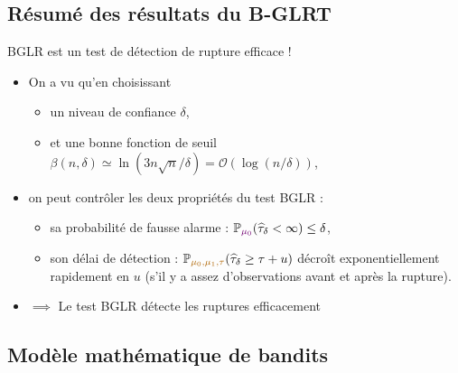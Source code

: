\documentclass[11pt,french,ignorenonframetext,]{beamer}
\providecommand{\tightlist}{%
  \setlength{\itemsep}{0pt}\setlength{\parskip}{0pt}}
\begin{document}
\subsection{\hfill{}Résumé des résultats du B-GLRT\hfill{}}

\begin{frame}{BGLR est un test de détection de rupture efficace \dCooley{} !}

  \begin{itemize}
    \item
    On a vu qu'en choisissant
    \begin{itemize}\tightlist
      \item
      un niveau de confiance $\delta$,
      \item
      et une bonne fonction de seuil $\beta(n,\delta) \simeq \ln(3n \sqrt{n}/\delta) = \mathcal{O}(\log(n/\delta))$,
    \end{itemize}
    \pause
    \item
    on peut contrôler les deux propriétés du test BGLR :
    \begin{itemize}\tightlist
      \item
        sa \alert{probabilité de fausse alarme} :
        $\mathbb{P}_{\textcolor{darkpurple}{\mu_0}}(\widehat{\tau}_\delta < \infty) \leq \delta$,
      \item
        son \alert{délai de détection} :
        $\mathbb{P}_{\textcolor{gold}{\mu_0,\mu_1,\tau}} (\widehat{\tau}_{\delta} \geq \tau + u)$ décroît exponentiellement rapidement en $u$
        (s'il y a assez d'observations avant et après la rupture).
    \end{itemize}

    \item
    $\implies$ Le test BGLR détecte les ruptures efficacement \dCooley{}
  \end{itemize}


\end{frame}


\subsection{\hfill{}Modèle mathématique de bandits\hfill{}}
\end{document}

